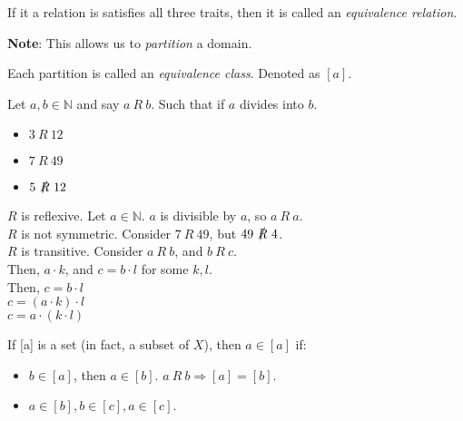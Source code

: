 \documentclass{article}
\newcommand{\N}{\ensuremath{\mathbb{N}}}
\begin{document}
        \begin{definition}
            If it a relation is satisfies all three traits, then it is called an \textit{equivalence relation}.
        \end{definition}
        \textbf{Note}: This allows us to \textit{partition} a domain.

        \begin{definition}
            Each partition is called an \textit{equivalence class}. Denoted as $[a]$.
        \end{definition}

        \vspace{0.5cm}

        \begin{example}
            Let $a,b \in \N$ and say $a \ R \ b$. Such that if $a$ divides into $b$.
            \begin{itemize}
                \item $3 \ R \ 12$
                \item $7 \ R \ 49$
                \item $5 \ \slashed{R} \ 12$
            \end{itemize}
        \end{example}
        
        \noindent $R$ is reflexive. Let $a\in \N$. $a$ is divisible by $a$, so $a \ R \ a$. \\
        $R$ is not symmetric. Consider $7 \ R \ 49$, but $49  \ \slashed{R} \ 4$. \\
        $R$ is transitive. Consider $a \ R \ b$, and $b \ R \ c$. \\
        Then, $a\cdot k$, and $c = b\cdot l$ for some $k, l$. \\
        Then, $c = b\cdot l$ \\
        $c = (a\cdot k)\cdot l$ \\
        $c = a\cdot (k \cdot l)$

        \vspace{0.5cm}

        \begin{example}
            If [a] is a set (in fact, a subset of $X$), then $a\in [a]$ if: 
            \begin{itemize}
                \item $b\in [a]$, then $a\in [b]$. $a \ R \ b \Rightarrow [a] = [b]$.
                \item $a\in [b], b\in [c], a\in [c]$.
            \end{itemize}
        \end{example}
\end{document}
